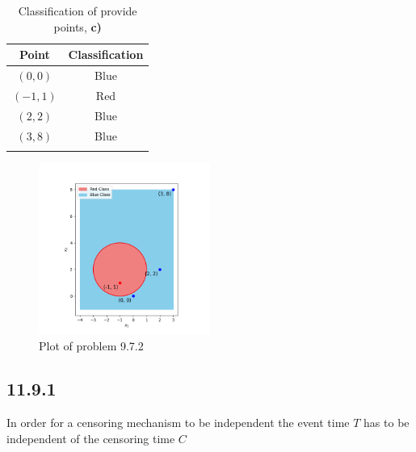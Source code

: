 \documentclass[12pt]{article}
\begin{document}
\begin{table}[h!]
    \centering
    \caption{Classification of provide points, \textbf{c)}}
    \vspace*{4mm}
    \label{tab:classification}
    \begin{tabular}{cc}
        \Xhline{3\arrayrulewidth}
        Point & Classification \\\hline
        $(0,0)$ &  Blue  \\ 
        $(-1,1)$ &  Red   \\ 
        $(2,2)$ &  Blue  \\ 
        $(3,8)$ &  Blue   \\ 
    \Xhline{3\arrayrulewidth}
    \end{tabular}
\end{table}

\begin{figure}[ht!]
    \centering
    \includegraphics[width=0.5\textwidth]{../plots/9_7_2.png}
    \caption{Plot of problem 9.7.2}
    \label{fig:9_7_2}
\end{figure}

\subsection*{11.9.1}

In order for a censoring mechanism to be independent the event time $T$ has to be independent of the censoring time $C$
\end{document}
